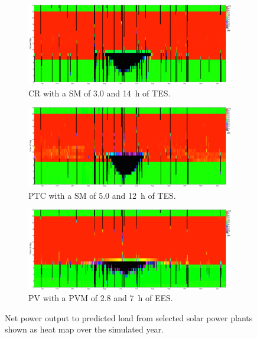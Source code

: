 \begin{figure}[!htbp]
        \centering   
        \begin{subfigure}[b]{1\textwidth}
                \centering
                \includegraphics[width=1\textwidth]{FIG/HeatmapCR}
                \caption{CR with a SM of 3.0 and 14~h of TES.}\label{HeatmapCR}
        \end{subfigure}
        
\par\medskip %

        \begin{subfigure}[b]{1\textwidth}
                \centering
                \includegraphics[width=1\textwidth]{FIG/HeatmapPTC}
                \caption{PTC with a SM of 5.0 and 12~h of TES.}\label{HeatmapPTC}
        \end{subfigure}
        
\par\medskip %
           
        \begin{subfigure}[b]{1\textwidth}
                \centering
                \includegraphics[width=1\textwidth]{FIG/HeatmapPV}
                \caption{PV with a PVM of 2.8 and 7~h of EES.}\label{HeatmapPV}
        \end{subfigure}
        \caption[Net power output to predicted load from selected solar power plants shown as heat map over the simulated year.]{Net power output to predicted load from selected solar power plants shown as heat map over the simulated year.}\label{Heatmap}
\end{figure}
